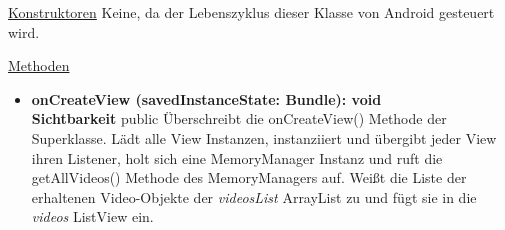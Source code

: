 \underline{Konstruktoren}\newline
\indent Keine, da der Lebenszyklus dieser Klasse von Android gesteuert wird.\newline

\underline{Methoden}
\begin{itemize}
\itemsep0pt
\item \textbf{onCreateView (savedInstanceState: Bundle): void}\hfill\\
\textbf{Sichtbarkeit} public\newline
Überschreibt die onCreateView() Methode der Superklasse. Lädt alle View Instanzen, instanziiert und übergibt jeder View ihren Listener, holt sich eine MemoryManager Instanz und ruft die getAllVideos() Methode des MemoryManagers auf. Weißt die Liste der erhaltenen Video-Objekte der \textit{videosList} ArrayList zu und fügt sie in die \textit{videos} ListView ein.

\end{itemize}